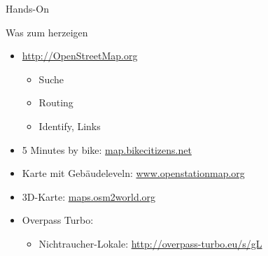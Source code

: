 \documentclass{beamer}
\begin{document}
\begin{frame}{Hands-On}

Was zum herzeigen

\begin{itemize}
  \item \url{http://OpenStreetMap.org}
  \begin{itemize}
    \item Suche
    \item Routing
    \item Identify, Links
  \end{itemize}
\vspace{0.3cm}
  \item 5 Minutes by bike: \href{http://map.bikecitizens.net/at-graz\#/!/1/1/47.06901,15.4097/*,5}{map.bikecitizens.net}
\vspace{0.3cm}
  \item Karte mit Gebäudeleveln: \href{http://www.openstationmap.org/\#19/47.07240/15.41652}{www.openstationmap.org}
\vspace{0.3cm}
  \item 3D-Karte: \href{http://maps.osm2world.org/?zoom=18\&lat=47.06098\&lon=15.47024\&layers=B0TTFF}{maps.osm2world.org}
\vspace{0.3cm}
  \item Overpass Turbo:
  \begin{itemize}
    \item Nichtraucher-Lokale: \url{http://overpass-turbo.eu/s/gL}
  \end{itemize}
\end{itemize}

\end{frame}
\end{document}
